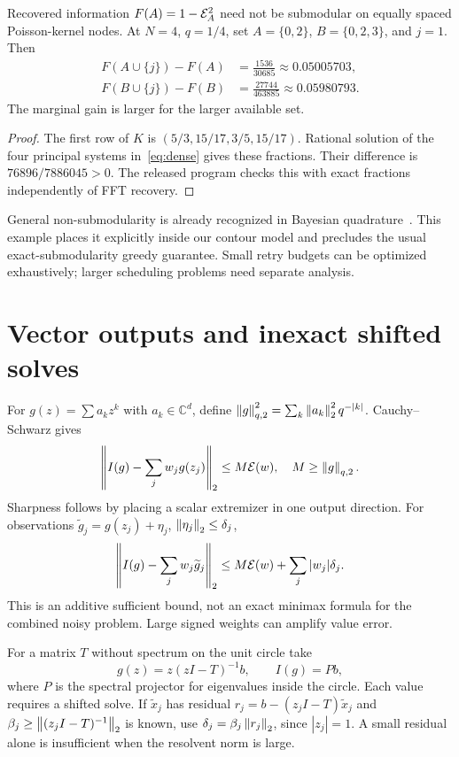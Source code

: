 \documentclass[final,leqno,letterpaper]{etna}
\begin{document}
\begin{proposition}\label{prop:nonmod}
Recovered information $F(A)=1-\mathcal E_A^2$ need not be submodular on equally spaced Poisson-kernel nodes. At $N=4$, $q=1/4$, set $A=\{0,2\}$, $B=\{0,2,3\}$, and $j=1$. Then
\begin{align}
F(A\cup\{j\})-F(A)&=\frac{1536}{30685}\approx0.05005703,\\
F(B\cup\{j\})-F(B)&=\frac{27744}{463885}\approx0.05980793.
\label{eq:counter}
\end{align}
The marginal gain is larger for the larger available set.
\end{proposition}
\begin{proof}
The first row of $K$ is $(5/3,15/17,3/5,15/17)$. Rational solution of the four principal systems in~\eqref{eq:dense} gives these fractions. Their difference is $76896/7886045>0$. The released program checks this with exact fractions independently of FFT recovery.
\end{proof}

General non-submodularity is already recognized in Bayesian quadrature~\cite{HD12}. This example places it explicitly inside our contour model and precludes the usual exact-submodularity greedy guarantee. Small retry budgets can be optimized exhaustively; larger scheduling problems need separate analysis.

\FloatBarrier
\section{Vector outputs and inexact shifted solves}
For $g(z)=\sum a_kz^k$ with $a_k\in\mathbb C^d$, define
$\left\lVert g\right\rVert_{q,2}^2=\sum_k\left\lVert a_k\right\rVert_2^2q^{-|k|}$. Cauchy--Schwarz gives
\begin{equation*}
\left\lVert I(g)-\sum_jw_jg(z_j)\right\rVert_2\le M\mathcal E(w),\quad M\ge\left\lVert g\right\rVert_{q,2}.
\end{equation*}
Sharpness follows by placing a scalar extremizer in one output direction. For observations $\widetilde g_j=g(z_j)+\eta_j$, $\left\lVert\eta_j\right\rVert_2\le\delta_j$,
\begin{equation}
\left\lVert I(g)-\sum_jw_j\widetilde g_j\right\rVert_2
\le M\mathcal E(w)+\sum_j|w_j|\delta_j.
\label{eq:noise}
\end{equation}
This is an additive sufficient bound, not an exact minimax formula for the combined noisy problem. Large signed weights can amplify value error.

For a matrix $T$ without spectrum on the unit circle take
\begin{equation*}
g(z)=z(zI-T)^{-1}b,\qquad I(g)=Pb,
\end{equation*}
where $P$ is the spectral projector for eigenvalues inside the circle. Each value requires a shifted solve. If $\widetilde x_j$ has residual $r_j=b-(z_jI-T)\widetilde x_j$ and $\beta_j\ge\left\lVert(z_jI-T)^{-1}\right\rVert_2$ is known, use $\delta_j=\beta_j\left\lVert r_j\right\rVert_2$, since $|z_j|=1$. A small residual alone is insufficient when the resolvent norm is large.
\end{document}
